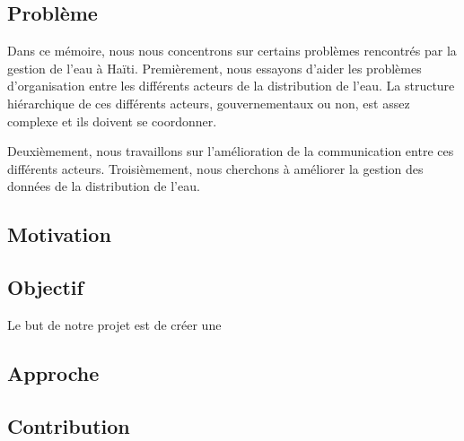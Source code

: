 \documentclass{eplmastersthesis_FR}
\begin{document}
		\subsection*{Problème}

			Dans ce mémoire, nous nous concentrons sur certains problèmes rencontrés par la gestion de l'eau à Haïti. Premièrement, nous essayons d'aider les problèmes d'organisation entre les différents acteurs de la distribution de l'eau. La structure hiérarchique de ces différents acteurs, gouvernementaux ou non, est assez complexe et ils doivent se coordonner.

			Deuxièmement, nous travaillons sur l'amélioration de la communication entre ces différents acteurs. Troisièmement, nous cherchons à améliorer la gestion des données de la distribution de l'eau.

		\subsection*{Motivation}



		\subsection*{Objectif}

			Le but de notre projet est de créer une
		\subsection*{Approche}
		\subsection*{Contribution}
\end{document}
